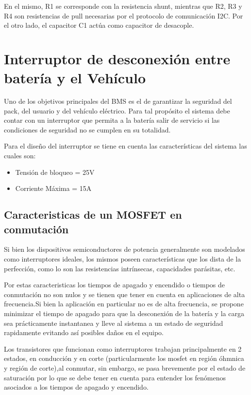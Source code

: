 \documentclass[10pt, a4paper]{report}
\begin{document}
En el mismo, R1 se corresponde con la resistencia shunt, mientras que R2, R3 y
R4 son resistencias de pull necesarias por el protocolo de comunicaci\'on I2C.
Por el otro lado, el capacitor C1 act\'ua como capacitor de desacople.

\section{Interruptor de desconexión entre batería y el Vehículo}

Uno de los objetivos principales del BMS es el de garantizar la seguridad del
pack, del usuario y del vehículo eléctrico. Para tal propósito el sistema debe
contar con un interruptor que permita a la batería salir de servicio si las
condiciones de seguridad no se cumplen en su totalidad.

Para el diseño del interruptor se tiene en cuenta las características del
sistema las cuales son:

\begin{itemize}
	\item Tensión de bloqueo = 25V
	\item Corriente Máxima = 15A
\end{itemize}

\subsection{Caracteristicas de un MOSFET en conmutación}

Si bien los dispositivos semiconductores de potencia generalmente son modelados
como interruptores ideales, los mismos poseen características que los dista de
la perfección, como lo son las resistencias intrínsecas, capacidades parásitas,
etc.

Por estas caracteristicas los tiempos de apagado y encendido o tiempos de
conmutación no son nulos y se tienen que tener en cuenta en aplicaciones de alta
frecuencia.Si bien la aplicación en particular no es de alta frecuencia, se
propone minimizar el tiempo de apagado para que la desconexión de la batería y
la carga sea prácticamente instantanea y lleve al sistema a un estado de
seguridad rapidamente evitando así posibles daños en el equipo.

Los transistores que funcionan como interruptores trabajan principalmente en 2
estados, en conducción y en corte (particularmente los mosfet en región
\'ohmnica y región de corte),al conmutar, sin embargo, se pasa brevemente por el 
estado de saturación por lo que se debe tener en cuenta para entender los 
fenómenos asociados a los tiempos de apagado y encendido.
\end{document}
